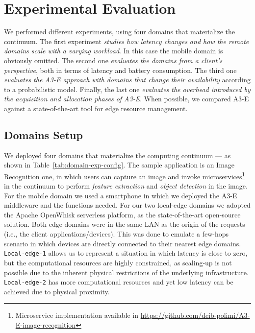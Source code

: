 \section{Experimental Evaluation}\label{sec:evaluation}

We performed different experiments, using four domains that materialize the continuum. The first experiment \emph{studies how latency changes and how the remote domains scale with a varying workload}. In this case the mobile domain is obviously omitted. The second one \emph{evaluates the domains from a client's perspective}, both in terms of latency and battery consumption. The third one \emph{evaluates the A3-E approach with domains that change their availability} according to a probabilistic model.
Finally, the last one \emph{evaluates the overhead introduced by the acquisition and allocation phases of A3-E}. When possible, we compared A3-E against a state-of-the-art tool for edge resource management.

\subsection{Domains Setup}


We deployed four domains that materialize the computing continuum --- as shown in Table~\ref{tab:domain-exp-config}. The sample application is an Image Recognition one, in which users can capture an image and invoke microservices\footnote{Microservice implementation available in \url{https://github.com/deib-polimi/A3-E-image-recognition}} in the continuum to perform \textit{feature extraction} and \textit{object detection} in the image. For the mobile domain we used a smartphone in which we deployed the A3-E middleware and the functions needed. For our two local-edge domains we adopted the Apache OpenWhisk serverless platform, as the state-of-the-art open-source solution. Both edge domains were in the same LAN as the origin of the requests (i.e., the client applications/devices). This was done to emulate a few-hops scenario in which devices are directly connected to their nearest edge domains. \texttt{Local-edge-1} allows us to represent a situation in which latency is close to zero, but the computational resources are highly constrained, as scaling-up is not possible due to the inherent physical restrictions of the underlying infrastructure. \texttt{Local-edge-2} has more computational resources and yet low latency can be achieved due to physical proximity.

